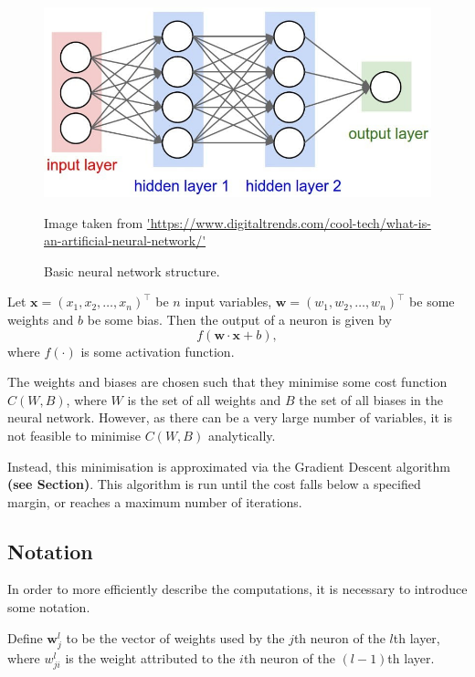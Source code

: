 \documentclass[honours,12pt]{unswthesis}
\numberwithin{equation}{section}
\begin{document}
\begin{figure}[h]
	\centering
	\includegraphics[width=\textwidth]{Images/3_nnet_structure.jpg}
	\caption{Basic neural network structure.}
	\small Image taken from \url{'https://www.digitaltrends.com/cool-tech/what-is-an-artificial-neural-network/'}
\end{figure}

Let $\mathbf{x} = (x_1, x_2, \ldots, x_n)^\top$ be $n$ input variables, $\mathbf{w} = (w_1, w_2, \ldots, w_n)^\top$ be some weights and $b$ be some bias. Then the output of a neuron is given by
\[
	f(\mathbf{w}\cdot\mathbf{x} + b),
\]
where $f(\cdot)$ is some activation function.

The weights and biases are chosen such that they minimise some cost function $C(W,B)$, where $W$ is the set of all weights and $B$ the set of all biases in the neural network. However, as there can be a very large number of variables, it is not feasible to minimise $C(W,B)$ analytically.

Instead, this minimisation is approximated via the Gradient Descent algorithm \textbf{(see Section)}. This algorithm is run until the cost falls below a specified margin, or reaches a maximum number of iterations.

\subsection{Notation}\label{nnets-not}

In order to more efficiently describe the computations, it is necessary to introduce some notation.

Define $\mathbf{w}_j^l$ to be the vector of weights used by the $j$th neuron of the $l$th layer, where $w_{ji}^l$ is the weight attributed to the $i$th neuron of the $(l-1)$th layer.
\end{document}
